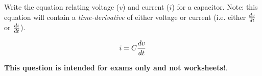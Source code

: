 

Write the equation relating voltage ($v$) and current ($i$) for a capacitor.  Note: this equation will contain a {\it time-derivative} of either voltage or current (i.e. either $dv \over dt$ or $di \over dt$).

\vskip 30pt







$$i = C {dv \over dt}$$







{\bf This question is intended for exams only and not worksheets!}.



